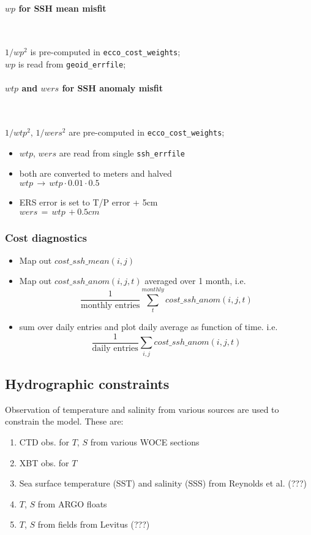 \paragraph{$wp$ for SSH mean misfit} ~

$1/wp^2$ is pre-computed in {\tt ecco\_cost\_weights}; \\
$wp$ is read from {\tt geoid\_errfile};

\paragraph{$wtp$ and $wers$ for SSH anomaly misfit} ~

$1/wtp^2$, $1/wers^2$ are pre-computed in {\tt ecco\_cost\_weights}; \\
%
\begin{itemize}
%
\item
$wtp$, $wers$ are read from single {\tt ssh\_errfile}
%
\item
both are converted to meters and halved \\
$ wtp \, \longrightarrow \, wtp \cdot 0.01 \cdot 0.5 $
%
\item
ERS error is set to T/P error + 5cm \\
$ wers \, = \, wtp \, + 0.5cm $
%
\end{itemize}

\subsubsection{Cost diagnostics}

\begin{itemize}
%
\item
Map out $ cost\_ssh\_mean(i,j) $
%
\item
Map out $ cost\_ssh\_anom(i,j,t) $ averaged over 1 month, i.e.
\[
\frac{1}{\text{monthly entries}} \sum_{t}^{monthly} cost\_ssh\_anom(i,j,t)
\]
%
\item
sum over daily entries and plot daily average as function of time. i.e.
\[
\frac{1}{\text{daily entries}} \sum_{i,j} cost\_ssh\_anom(i,j,t)
\]
\end{itemize}

\subsection{Hydrographic constraints}

Observation of temperature and salinity from various sources are
used to constrain the model. These are:
%
\begin{enumerate}
%
\item
CTD obs. for $T$, $S$ from various WOCE sections
%
\item
XBT obs. for $T$
%
\item
Sea surface temperature (SST) and salinity (SSS) from
Reynolds et al. (???)
%
\item
$T$, $S$ from ARGO floats
%
\item
$T$, $S$ from fields from Levitus (???)
%
\end{enumerate}


